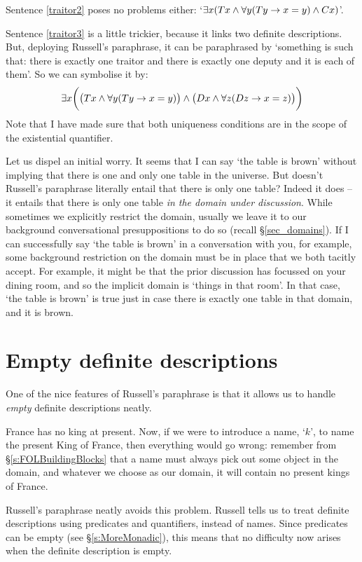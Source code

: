 Sentence \ref{traitor2} poses no problems either: `$\exists x (Tx \wedge \forall y(Ty \rightarrow x = y) \wedge Cx)$'.

Sentence \ref{traitor3} is a little trickier, because it links two definite descriptions. But, deploying  Russell's paraphrase, it can be paraphrased by `something is such that: there is exactly one traitor and there is exactly one deputy and it is each of them'. So we can symbolise it by: 
$$\exists x\biggl(\bigl(Tx \wedge \forall y(Ty \rightarrow x = y) \bigr) \wedge \bigl(Dx \wedge \forall z(Dz \rightarrow x = z) \bigr)\biggr)$$
Note that I have made sure that both uniqueness conditions are in the scope of the existential quantifier.

Let us dispel an initial worry. It seems that I can say `the table is brown' without implying that there is one and only one table in the universe. But doesn't Russell's paraphrase literally entail that there is only one table? Indeed it does – it entails that there is only one table \emph{in the domain under discussion}. While sometimes we explicitly restrict the domain, usually we leave it to our background conversational presuppositions to do so (recall §\ref{sec_domains}). If I can successfully say `the table is brown' in a conversation with you, for example, some background restriction on the domain must be in place that we both tacitly accept. For example, it might be that the prior discussion has focussed on your dining room, and so the implicit domain is `things in that room'. In that case, `the table is brown' is true just in case there is exactly one table in that domain, and it is brown.


\section{Empty definite descriptions}
One of the nice features of Russell's paraphrase is that it allows us to handle \emph{empty} definite descriptions neatly. 

France has no king at present. Now, if we were to introduce a name, `$k$', to name the present King of France, then everything would go wrong: remember from §\ref{s:FOLBuildingBlocks} that a name must always pick out  some object in the domain, and whatever we choose as our domain, it will contain no present kings of France. 

Russell's paraphrase neatly avoids this problem. Russell tells us to treat definite descriptions using predicates and quantifiers, instead of names. Since predicates can be empty (see §\ref{s:MoreMonadic}), this means that no difficulty now arises when the definite description is empty. 

